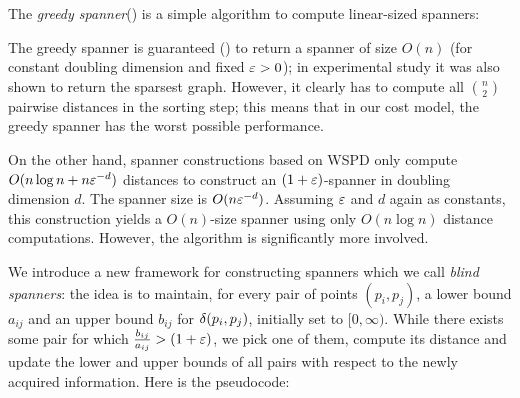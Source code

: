 \documentclass[a4paper,UKenglish,cleveref, autoref]{lipics-v2019}
\begin{document}
The \emph{greedy spanner}(\cite{althofer1993sparse}) is a simple algorithm to compute linear-sized spanners:
\begin{algorithmic}
\label{alg:greedy_spanner}
    \EndIf
    \EndFor
\EndFunction
\end{algorithmic}

The greedy spanner is guaranteed (\cite{althofer1993sparse}) to return a spanner of size $O(n)$
(for constant doubling dimension and fixed $\varepsilon>0$); in experimental study \cite{farshi2009experimental}
it was also shown to return the sparsest graph. However, it clearly
has to compute all $\binom{n}{2}$ pairwise distances in the sorting step;
this means that in our cost model, the greedy spanner has the worst possible
performance.

On the other hand, spanner constructions based on WSPD only compute
$O(n\log n+n \varepsilon^{-d})$ distances 
to construct an $(1+\varepsilon)$-spanner in doubling dimension $d$.
The spanner size is $O(n\varepsilon^{-d})$. Assuming $\varepsilon$ and $d$ again as constants,
this construction yields a $O(n)$-size spanner using only $O(n\log n)$ distance
computations. However, the algorithm is significantly more involved.

%
We introduce a new framework for constructing spanners
which we call \emph{blind spanners}: the idea is to maintain,
for every pair of points $(p_i,p_j)$,
a lower bound $a_{ij}$ and an upper bound $b_{ij}$ for $\delta(p_i,p_j)$,
initially set to $[0,\infty)$. While there exists some pair for which $\frac{b_{ij}}{a_{ij}}>(1+\varepsilon)$,
we pick one of them, compute its distance and update the lower and upper bounds of
all pairs with respect to the newly acquired information. Here is the pseudocode:

\begin{algorithmic}
\label{alg:blind_spanner}
     
    \State {}
    \EndWhile
\EndFunction
\end{algorithmic}
\end{document}
